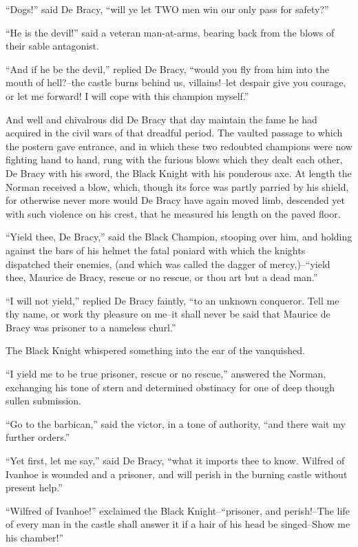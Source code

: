 ``Dogs!'' said De Bracy, ``will ye let TWO men win our only pass for
safety?''

``He is the devil!'' said a veteran man-at-arms, bearing back from the
blows of their sable antagonist.

``And if he be the devil,'' replied De Bracy, ``would you fly from him
into the mouth of hell?--the castle burns behind us, villains!--let
despair give you courage, or let me forward! I will cope with this
champion myself.''

And well and chivalrous did De Bracy that day maintain the fame he had
acquired in the civil wars of that dreadful period. The vaulted passage
to which the postern gave entrance, and in which these two redoubted
champions were now fighting hand to hand, rung with the furious blows
which they dealt each other, De Bracy with his sword, the Black Knight
with his ponderous axe. At length the Norman received a blow, which,
though its force was partly parried by his shield, for otherwise never
more would De Bracy have again moved limb, descended yet with such
violence on his crest, that he measured his length on the paved floor.

``Yield thee, De Bracy,'' said the Black Champion, stooping over him,
and holding against the bars of his helmet the fatal poniard with which
the knights dispatched their enemies, (and which was called the dagger
of mercy,)--``yield thee, Maurice de Bracy, rescue or no rescue, or thou
art but a dead man.''

``I will not yield,'' replied De Bracy faintly, ``to an unknown
conqueror. Tell me thy name, or work thy pleasure on me--it shall never
be said that Maurice de Bracy was prisoner to a nameless churl.''

The Black Knight whispered something into the ear of the vanquished.

``I yield me to be true prisoner, rescue or no rescue,'' answered the
Norman, exchanging his tone of stern and determined obstinacy for one of
deep though sullen submission.

``Go to the barbican,'' said the victor, in a tone of authority, ``and
there wait my further orders.''

``Yet first, let me say,'' said De Bracy, ``what it imports thee to
know. Wilfred of Ivanhoe is wounded and a prisoner, and will perish in
the burning castle without present help.''

``Wilfred of Ivanhoe!'' exclaimed the Black Knight--``prisoner, and
perish!--The life of every man in the castle shall answer it if a hair
of his head be singed--Show me his chamber!''

